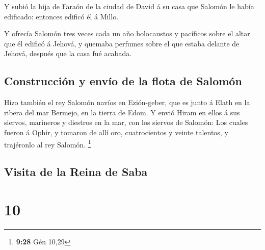  Y subió la hija de Faraón de la ciudad de David á su casa
que Salomón le había edificado: entonces edificó él á Millo.

 Y ofrecía Salomón tres veces cada un año holocaustos y
pacíficos sobre el altar que él edificó á Jehová, y quemaba perfumes
sobre el que estaba delante de Jehová, después que la casa fué acabada.

\hypertarget{construcciuxf3n-y-envuxedo-de-la-flota-de-salomuxf3n}{%
\subsection{Construcción y envío de la flota de
Salomón}\label{construcciuxf3n-y-envuxedo-de-la-flota-de-salomuxf3n}}

 Hizo también el rey Salomón navíos en Ezión-geber, que es
junto á Elath en la ribera del mar Bermejo, en la tierra de Edom.
 Y envió Hiram en ellos á sus siervos, marineros y diestros
en la mar, con los siervos de Salomón:  Los cuales fueron á
Ophir, y tomaron de allí oro, cuatrocientos y veinte talentos, y
trajéronlo al rey Salomón. \footnote{\textbf{9:28} Gén 10,29}

\hypertarget{visita-de-la-reina-de-saba}{%
\subsection{Visita de la Reina de
Saba}\label{visita-de-la-reina-de-saba}}

\hypertarget{section-9}{%
\section{10}\label{section-9}}


